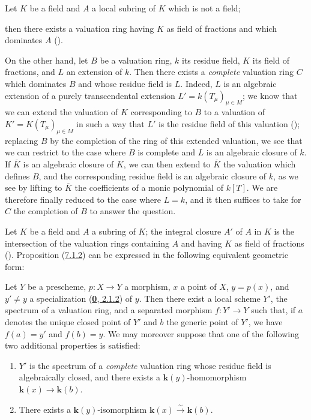 \begin{env}[7.1.2]
\label{II.7.1.2}
Let $K$ be a field and $A$ a local subring of $K$ which is not a field;


then there exists a valuation ring having $K$ as field of fractions and
which dominates $A$ (\cite[p.~1-07, lemma~2]{I-1}).

On the other hand, let $B$ be a valuation ring, $k$ its residue field,
$K$ its field of fractions, and $L$ an extension of $k$. Then there exists a
\emph{complete} valuation ring $C$ which dominates $B$ and whose residue
field is $L$. Indeed, $L$ is an algebraic extension of a purely transcendental
extension $L'=k(T_\mu)_{\mu\in M}$; we know that we can extend the
valuation of $K$ corresponding to $B$ to a valuation of
$K'=K(T_\mu)_{\mu\in M}$ in such a way that $L'$ is the residue field of this
valuation (\cite[p.~98]{II-24}); replacing $B$ by the completion of the ring
of this extended valuation, we see that we can restrict to the case where $B$
is complete and $L$ is an algebraic closure of $k$. If $\overline{K}$ is an
algebraic closure of $K$, we can then extend to $\overline{K}$ the
valuation which defines $B$, and the corresponding residue field is an
algebraic closure of $k$, as we see by lifting to $\overline{K}$
the coefficients of a monic polynomial of $k[T]$. We are therefore finally
reduced to the case where $L=k$, and it then suffices to take for $C$ the
completion of $B$ to answer the question.
\end{env}

\begin{env}[7.1.3]
\label{II.7.1.3}
Let $K$ be a field and $A$ a subring of $K$; the integral closure $A'$
of $A$ in $K$ is the intersection of the valuation rings containing $A$ and
having $K$ as field of fractions
(\cite[p.~51, th.~2]{I-11}). Proposition
(\hyperref[II.7.1.2]{7.1.2}) can be expressed in the following equivalent
geometric form:
\end{env}

\begin{proposition}[7.1.4]
\label{II.7.1.4}
Let $Y$ be a prescheme, $p:X\to Y$ a morphism, $x$ a point of $X$,
$y=p(x)$, and $y'\neq y$ a specialization
\textup{(\hyperref[0.2.1.2]{\textbf{0}, 2.1.2})} of $y$. Then there exist a local scheme
$Y'$, the spectrum of a valuation ring, and a separated morphism $f:Y'\to Y$
such that, if $a$ denotes the unique closed point of $Y'$ and $b$ the generic
point of $Y'$, we have $f(a)=y'$ and $f(b)=y$. We may moreover suppose
that one of the following two additional properties is satisfied:
\begin{enumerate}
\item[\rm{(i)}] $Y'$ is the spectrum of a \emph{complete} valuation ring
whose residue field is algebraically closed, and there exists a
$\boldsymbol{k}(y)$-homomorphism $\boldsymbol{k}(x)\to \boldsymbol{k}(b)$.
\item[\rm{(ii)}] There exists a $\boldsymbol{k}(y)$-isomorphism
$\boldsymbol{k}(x)\xrightarrow{\sim}\boldsymbol{k}(b)$.
\end{enumerate}
\end{proposition}

